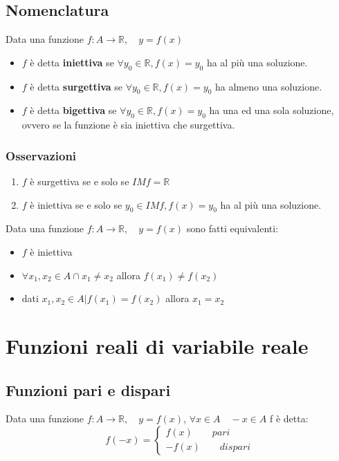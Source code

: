 \documentclass[11pt,a4paper,notitlepage]{report}
\let\numberset\mathbb
\newcommand{\R}{\numberset{R}}
\begin{document}
\subsection{Nomenclatura}
Data una funzione $f: A \rightarrow \R , \quad y=f(x)$
\begin{itemize}
	\item $f$ è detta \textbf{iniettiva} se $\forall y_0 \in \R , f(x)=y_0$ ha al più una soluzione.
	\item $f$ è detta \textbf{surgettiva} se $\forall y_0 \in \R , f(x)=y_0$ ha almeno una soluzione.
	\item $f$ è detta \textbf{bigettiva} se $\forall y_0 \in \R , f(x)=y_0$ ha una ed una sola soluzione, ovvero se la funzione è sia iniettiva che surgettiva.
\end{itemize}

\subsubsection{Osservazioni}
\begin{enumerate}
	\item $f$ è surgettiva se e solo se $IM f=\R$
	\item $f$ è iniettiva se e solo se $y_0 \in IM f, f(x)=y_0$ ha al più una soluzione.
\end{enumerate}

Data una funzione $f: A \rightarrow \R , \quad y=f(x)$ sono fatti equivalenti:
\begin{itemize}
	\item $f$ è iniettiva
	\item $\forall x_1, x_2 \in A \cap x_1 \neq x_2$ allora $f(x_1)\neq f(x_2)$
	\item dati $x_1,x_2 \in A | f(x_1)=f(x_2)$ allora $x_1=x_2$
\end{itemize}


\section{Funzioni reali di variabile reale}
\subsection{Funzioni pari e dispari}
Data una funzione $f: A \rightarrow \R , \quad y=f(x)$, $\forall x\in A \quad -x\in A$ f è detta:
\[f(-x)= \begin{cases}
	f(x) \qquad pari\\
	-f(x) \qquad dispari
\end{cases}
\]
\end{document}
